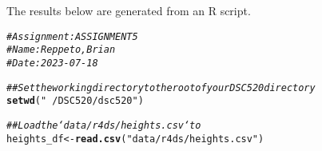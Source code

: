 \documentclass{article}\usepackage[]{graphicx}\usepackage[]{xcolor}
\makeatletter
\newcommand{\hlstr}[1]{\textcolor[rgb]{0.192,0.494,0.8}{#1}}%
\newcommand{\hlcom}[1]{\textcolor[rgb]{0.678,0.584,0.686}{\textit{#1}}}%
\newcommand{\hlstd}[1]{\textcolor[rgb]{0.345,0.345,0.345}{#1}}%
\newcommand{\hlkwb}[1]{\textcolor[rgb]{0.69,0.353,0.396}{#1}}%
\newcommand{\hlkwd}[1]{\textcolor[rgb]{0.737,0.353,0.396}{\textbf{#1}}}%
\newenvironment{kframe}{%
 \def\at@end@of@kframe{}%
 \ifinner\ifhmode%
  \def\at@end@of@kframe{\end{minipage}}%
  \begin{minipage}{\columnwidth}%
 \fi\fi%
 \def\FrameCommand##1{\hskip\@totalleftmargin \hskip-\fboxsep
 \colorbox{shadecolor}{##1}\hskip-\fboxsep
     \hskip-\linewidth \hskip-\@totalleftmargin \hskip\columnwidth}%
 \MakeFramed {\advance\hsize-\width
   \@totalleftmargin\z@ \linewidth\hsize
   \@setminipage}}%
 {\par\unskip\endMakeFramed%
 \at@end@of@kframe}
\newenvironment{knitrout}{}{} %
\makeatother
\begin{document}
\title{\title{\title{\title{\title{\title{\title{}}}}}}}



\maketitle
The results below are generated from an R script.

\begin{knitrout}
\color{fgcolor}\begin{kframe}
\begin{alltt}
\hlcom{# Assignment: ASSIGNMENT 5}
\hlcom{# Name: Reppeto, Brian}
\hlcom{# Date: 2023-07-18}

\hlcom{## Set the working directory to the root of your DSC 520 directory}
\hlkwd{setwd}\hlstd{(}\hlstr{"~/DSC520/dsc520"}\hlstd{)}

\hlcom{## Load the `data/r4ds/heights.csv` to}
\hlstd{heights_df} \hlkwb{<-} \hlkwd{read.csv}\hlstd{(}\hlstr{"data/r4ds/heights.csv"}\hlstd{)}


\end{alltt}
\end{kframe}
\end{knitrout}
\end{document}
